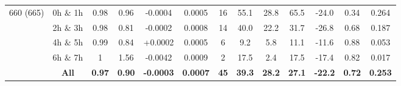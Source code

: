 \documentclass[onecolumn,3p,letterpaper,11pt]{elsarticle}
\begin{document}
\begin{table}[htbp!]
\begin{tabular}{ccccccccccccc}
\multirow{5}{*}{660 (665)}  &  0h $\&$ 1h  & 0.98    & 0.96    & -0.0004 & 0.0005      & 16  & 55.1    & 28.8        & 65.5        & -24.0    & 0.34    & 0.264   \\ 
                            &  2h $\&$ 3h  & 0.98    & 0.81    & -0.0002 & 0.0008      & 14  & 40.0    & 22.2        & 31.7        & -26.8    & 0.68    & 0.187   \\ 
                            &  4h $\&$ 5h  & 0.99    & 0.84    & +0.0002 & 0.0005      & 6   &  9.2    &  5.8        & 11.1        & -11.6    & 0.88    & 0.053   \\ 
                            &  6h $\&$ 7h  & 1       & 1.56    & -0.0042 & 0.0009      & 2   & 17.5    &  2.4        & 17.5        & -17.4    & 0.82    & 0.017   \\ 
                              &  \textbf{All}         & \textbf{0.97}    & \textbf{0.90}    & \textbf{-0.0003} & \textbf{0.0007}      & \textbf{45}  & \textbf{39.3}    & \textbf{28.2}        & \textbf{27.1}        & \textbf{-22.2}    & \textbf{0.72}    & \textbf{0.253}   \\ 
\hline 
\end{tabular}
\end{table}
\end{document}
